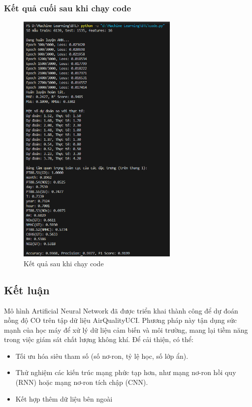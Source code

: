 \subsubsection{Kết quả cuối sau khi chạy code}
\begin{figure}[H]
    \centering
    \includegraphics[width=0.7\textwidth]{images/ANN/Ketquatoanbo.png}
    \caption{Kết quả sau khi chạy code}
    \label{fig:ann}
\end{figure}

\subsection{Kết luận}
Mô hình Artificial Neural Network đã được triển khai thành công để dự đoán nồng độ CO trên tập dữ liệu AirQualityUCI. Phương pháp này tận dụng sức mạnh của học máy để xử lý dữ liệu cảm biến và môi trường, mang lại tiềm năng trong việc giám sát chất lượng không khí. Để cải thiện, có thể:
\begin{itemize}
    \item Tối ưu hóa siêu tham số (số nơ-ron, tỷ lệ học, số lớp ẩn).
    \item Thử nghiệm các kiến trúc mạng phức tạp hơn, như mạng nơ-ron hồi quy (RNN) hoặc mạng nơ-ron tích chập (CNN).
    \item Kết hợp thêm dữ liệu bên ngoài
\end{itemize}
